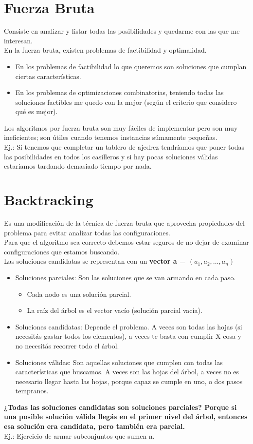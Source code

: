 \documentclass[10pt,a4paper]{article}
\begin{document}
\section*{Fuerza Bruta}
Consiste en analizar y listar todas las posibilidades y quedarme con las que me interesan. \\
En la fuerza bruta, existen problemas de factibilidad y optimalidad. 
\begin{itemize}
    \item En los problemas de factibilidad lo que queremos son soluciones que cumplan ciertas características. 
    \item En los problemas de optimizaciones combinatorias, teniendo todas las soluciones factibles me quedo con la mejor (según el criterio que considero qué es mejor). 
\end{itemize}
Los algoritmos por fuerza bruta son muy fáciles de implementar pero son muy ineficientes; son útiles cuando tenemos instancias súmamente pequeñas. \\
Ej.: Si tenemos que completar un tablero de ajedrez tendríamos que poner todas las posibilidades en todos los casilleros y si hay pocas soluciones válidas estaríamos tardando demasiado tiempo por nada.
\section*{Backtracking}
Es una modificación de la técnica de fuerza bruta que aprovecha propiedades del problema para evitar analizar todas las configuraciones. \\
Para que el algoritmo sea correcto debemos estar seguros de no dejar de examinar configuraciones que estamos buscando. \\
Las soluciones candidatas se representan con un \textbf{vector a = $(a_{1}, a_{2}, \dots, a_{n})$}
\begin{itemize}
    \item Soluciones parciales: Son las soluciones que se van armando en cada paso. 
    \begin{itemize}
        \item Cada nodo es una solución parcial.
        \item La raíz del árbol es el vector vacío (solución parcial vacía).
    \end{itemize}
    \item Soluciones candidatas: Depende el problema. A veces son todas las hojas (si necesitás gastar todos los elementos), a veces te basta con cumplir X cosa y no necesitás recorrer todo el árbol. 
    \item Soluciones válidas: Son aquellas soluciones que cumplen con todas las características que buscamos. A veces son las hojas del árbol, a veces no es necesario llegar hasta las hojas, porque capaz se cumple en uno, o dos pasos tempranos.
\end{itemize}
\textbf{¿Todas las soluciones candidatas son soluciones parciales? Porque si una posible solución válida llegás en el primer nivel del árbol, entonces esa solución era candidata, pero también era parcial.} \\
Ej.: Ejercicio de armar subconjuntos que sumen n.  
\end{document}
